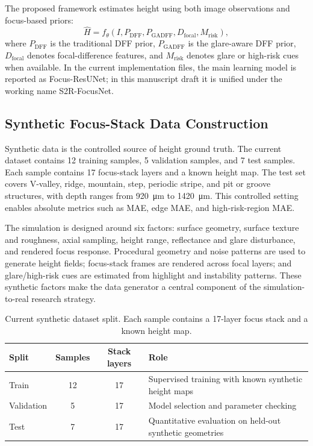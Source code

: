 \documentclass[11pt,a4paper]{article}
\newcommand{\method}{S2R-FocusNet}
\begin{document}
The proposed framework estimates height using both image observations and focus-based priors:
\begin{equation}
\hat{H}=f_{\theta}(I, P_{\mathrm{DFF}}, P_{\mathrm{GADFF}}, D_{\mathrm{focal}}, M_{\mathrm{risk}}),
\end{equation}
where \(P_{\mathrm{DFF}}\) is the traditional DFF prior, \(P_{\mathrm{GADFF}}\) is the glare-aware DFF prior, \(D_{\mathrm{focal}}\) denotes focal-difference features, and \(M_{\mathrm{risk}}\) denotes glare or high-risk cues when available. In the current implementation files, the main learning model is reported as Focus-ResUNet; in this manuscript draft it is unified under the working name \method.

\subsection{Synthetic Focus-Stack Data Construction}

Synthetic data is the controlled source of height ground truth. The current dataset contains 12 training samples, 5 validation samples, and 7 test samples. Each sample contains 17 focus-stack layers and a known height map. The test set covers V-valley, ridge, mountain, step, periodic stripe, and pit or groove structures, with depth ranges from \SI{920}{\micro\meter} to \SI{1420}{\micro\meter}. This controlled setting enables absolute metrics such as MAE, edge MAE, and high-risk-region MAE.

The simulation is designed around six factors: surface geometry, surface texture and roughness, axial sampling, height range, reflectance and glare disturbance, and rendered focus response. Procedural geometry and noise patterns are used to generate height fields; focus-stack frames are rendered across focal layers; and glare/high-risk cues are estimated from highlight and instability patterns. These synthetic factors make the data generator a central component of the simulation-to-real research strategy.

\begin{table}[t]
  \centering
  \caption{Current synthetic dataset split. Each sample contains a 17-layer focus stack and a known height map.}
  \label{tab:dataset_split}
  \small
  \begin{tabularx}{\linewidth}{lccX}
    \toprule
    Split & Samples & Stack layers & Role \\
    \midrule
    Train & 12 & 17 & Supervised training with known synthetic height maps \\
    Validation & 5 & 17 & Model selection and parameter checking \\
    Test & 7 & 17 & Quantitative evaluation on held-out synthetic geometries \\
    \bottomrule
  \end{tabularx}
\end{table}
\end{document}
